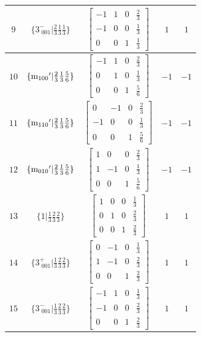 \documentclass[fleqn,8pt]{jsarticle}
\begin{document}
\begin{longtable}{ccccc}
$ 9 $ & $ \{3^{-}_{\,\,001}|\frac{2}{3} \frac{1}{3} \frac{1}{3}\} $ & $ \begin{bmatrix} -1 & 1 & 0 & \frac{2}{3} \\ -1 & 0 & 0 & \frac{1}{3} \\ 0 & 0 & 1 & \frac{1}{3} \end{bmatrix} $ & $ 1 $ & $ 1 $ \\ \hline
$ 10 $ & $ \{{\rm m}_{100}{}'|\frac{2}{3} \frac{1}{3} \frac{5}{6}\} $ & $ \begin{bmatrix} -1 & 1 & 0 & \frac{2}{3} \\ 0 & 1 & 0 & \frac{1}{3} \\ 0 & 0 & 1 & \frac{5}{6} \end{bmatrix} $ & $ -1 $ & $ -1 $ \\ \hline
$ 11 $ & $ \{{\rm m}_{110}{}'|\frac{2}{3} \frac{1}{3} \frac{5}{6}\} $ & $ \begin{bmatrix} 0 & -1 & 0 & \frac{2}{3} \\ -1 & 0 & 0 & \frac{1}{3} \\ 0 & 0 & 1 & \frac{5}{6} \end{bmatrix} $ & $ -1 $ & $ -1 $ \\ \hline
$ 12 $ & $ \{{\rm m}_{010}{}'|\frac{2}{3} \frac{1}{3} \frac{5}{6}\} $ & $ \begin{bmatrix} 1 & 0 & 0 & \frac{2}{3} \\ 1 & -1 & 0 & \frac{1}{3} \\ 0 & 0 & 1 & \frac{5}{6} \end{bmatrix} $ & $ -1 $ & $ -1 $ \\ \hline
$ 13 $ & $ \{1|\frac{1}{3} \frac{2}{3} \frac{2}{3}\} $ & $ \begin{bmatrix} 1 & 0 & 0 & \frac{1}{3} \\ 0 & 1 & 0 & \frac{2}{3} \\ 0 & 0 & 1 & \frac{2}{3} \end{bmatrix} $ & $ 1 $ & $ 1 $ \\ \hline
$ 14 $ & $ \{3^{+}_{\,\,001}|\frac{1}{3} \frac{2}{3} \frac{2}{3}\} $ & $ \begin{bmatrix} 0 & -1 & 0 & \frac{1}{3} \\ 1 & -1 & 0 & \frac{2}{3} \\ 0 & 0 & 1 & \frac{2}{3} \end{bmatrix} $ & $ 1 $ & $ 1 $ \\ \hline
$ 15 $ & $ \{3^{-}_{\,\,001}|\frac{1}{3} \frac{2}{3} \frac{2}{3}\} $ & $ \begin{bmatrix} -1 & 1 & 0 & \frac{1}{3} \\ -1 & 0 & 0 & \frac{2}{3} \\ 0 & 0 & 1 & \frac{2}{3} \end{bmatrix} $ & $ 1 $ & $ 1 $ \\ \hline

\end{longtable}
\end{document}
